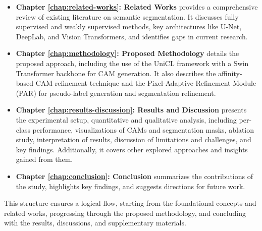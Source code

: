 \begin{itemize}
    \item \textbf{Chapter \ref{chap:related-works}: Related Works} provides a comprehensive review of existing literature on semantic segmentation. It discusses fully supervised and weakly supervised methods, key architectures like U-Net, DeepLab, and Vision Transformers, and identifies gaps in current research.

    \item \textbf{Chapter \ref{chap:methodology}: Proposed Methodology} details the proposed approach, including the use of the UniCL framework with a Swin Transformer backbone for CAM generation. It also describes the affinity-based CAM refinement technique and the Pixel-Adaptive Refinement Module (PAR) for pseudo-label generation and segmentation refinement.
    \item \textbf{Chapter \ref{chap:results-discussion}: Results and Discussion} presents the experimental setup, quantitative and qualitative analysis, including per-class performance, visualizations of CAMs and segmentation masks, ablation study, interpretation of results, discussion of limitations and challenges, and key findings. Additionally, it covers other explored approaches and insights gained from them.

    \item \textbf{Chapter \autoref{chap:conclusion}: Conclusion} summarizes the contributions of the study, highlights key findings, and suggests directions for future work.
\end{itemize}

This structure ensures a logical flow, starting from the foundational concepts and related works, progressing through the proposed methodology, and concluding with the results, discussions, and supplementary materials.

